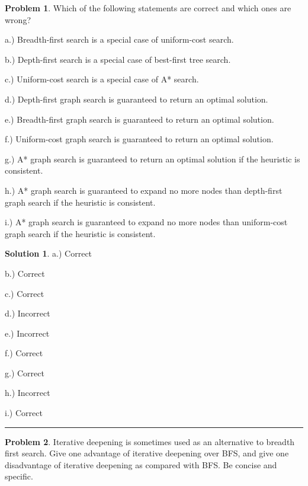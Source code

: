 \documentclass{article}
\theoremstyle{definition}
\newtheorem{problem}{Problem}
\def\fline{\rule{0.75\linewidth}{0.5pt}}
\newcommand{\finishline}{\begin{center}\fline\end{center}}
\newtheorem*{solution*}{Solution}
\newenvironment{solution}{\begin{solution*}}{{\finishline} \end{solution*}}
\begin{document}
\begin{problem} %
	Which of the following statements are correct and which ones are wrong?
	\item a.) Breadth-first search is a special case of uniform-cost search.
	\item b.) Depth-first search is a special case of best-first tree search.
	\item c.) Uniform-cost search is a special case of A* search.
	\item d.) Depth-first graph search is guaranteed to return an optimal solution.
	\item e.) Breadth-first graph search is guaranteed to return an optimal solution.
	\item f.) Uniform-cost graph search is guaranteed to return an optimal solution.
	\item g.) A* graph search is guaranteed to return an optimal solution if the heuristic is consistent.
	\item h.) A* graph search is guaranteed to expand no more nodes than depth-first graph search if the heuristic is consistent.
	\item i.) A* graph search is guaranteed to expand no more nodes than uniform-cost graph search if the heuristic is consistent.

\end{problem}

\begin{solution}
	\item a.) Correct
	\item b.) Correct
	\item c.) Correct
	\item d.) Incorrect
	\item e.) Incorrect
	\item f.) Correct
	\item g.) Correct
	\item h.) Incorrect
	\item i.) Correct 

\end{solution}


\begin{problem} %
	Iterative deepening is sometimes used as an alternative to breadth first search. Give one advantage of iterative deepening over BFS, and give one disadvantage of iterative deepening as compared with BFS. Be concise and specific.

\end{problem}
\end{document}
